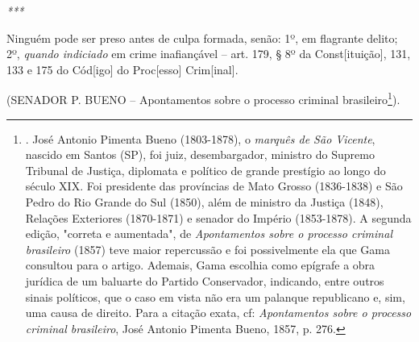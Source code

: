 \emph{***}

Ninguém pode ser preso antes de culpa formada, senão: 1º, em flagrante
delito; 2º, \emph{quando indiciado} em crime inafiançável -- art. 179, §
8º da Const{[}ituição{]}, 131, 133 e 175 do Cód{[}igo{]} do
Proc{[}esso{]} Crim{[}inal{]}.

(SENADOR P. BUENO -- Apontamentos sobre o processo criminal
brasileiro\footnote{. José Antonio Pimenta Bueno (1803-1878), o
  \emph{marquês de São Vicente}, nascido em Santos (SP), foi juiz,
  desembargador, ministro do Supremo Tribunal de Justiça, diplomata e
  político de grande prestígio ao longo do século XIX. Foi presidente
  das províncias de Mato Grosso (1836-1838) e São Pedro do Rio Grande do
  Sul (1850), além de ministro da Justiça (1848), Relações Exteriores
  (1870-1871) e senador do Império (1853-1878). A segunda edição,
  "correta e aumentada", de \emph{Apontamentos sobre o processo criminal
  brasileiro} (1857) teve maior repercussão e foi possivelmente ela que
  Gama consultou para o artigo. Ademais, Gama escolhia como epígrafe a
  obra jurídica de um baluarte do Partido Conservador, indicando, entre
  outros sinais políticos, que o caso em vista não era um palanque
  republicano e, sim, uma causa de direito. Para a citação exata, cf:
  \emph{Apontamentos sobre o processo criminal brasileiro}, José Antonio
  Pimenta Bueno, 1857, p. 276.}).

